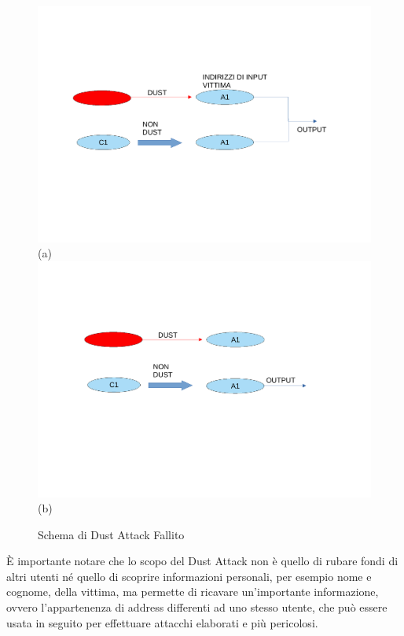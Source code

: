\begin{figure}[h!]
    \centering
    \includegraphics[scale=0.5, trim = 1cm 6cm 0cm 3cm, clip]{Images/fallito2.pdf}
    (a)
    \includegraphics[scale=0.5, trim = 1cm 7cm 0cm 2cm, clip]{Images/fallito1.pdf}
    (b)
    \caption{Schema di Dust Attack Fallito}
    \label{fig:fallito}
\end{figure}
\FloatBarrier

È importante notare che lo scopo del Dust Attack non è quello di rubare fondi di altri utenti né quello di scoprire informazioni personali, per esempio nome e cognome, della vittima, ma permette di ricavare un'importante informazione, ovvero l'appartenenza di address differenti ad uno stesso utente, che può essere usata in seguito per effettuare attacchi elaborati e più pericolosi.

